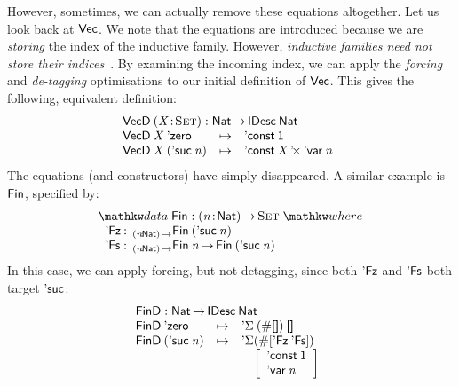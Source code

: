 However, sometimes, we can actually remove these equations altogether. Let us
look back at $\D{Vec}$. We note that the equations are introduced
because we are \emph{storing} the index of the inductive family.
However, \emph{inductive families need not store their
  indices}~\cite{brady:index-inductive-families}.  By examining the
incoming index, we can apply the \emph{forcing} and \emph{de-tagging}
optimisations to our initial definition of $\D{Vec}$. This gives the
following, equivalent definition:
%
\[\stk{
\VecD \:\PITEL{\V{X}}{\Set} : \Nat \To \IDesc{\Nat} \\
\begin{array}{@{}lll}
\VecD\:\V{X}\: \NatZero     & \mapsto & \DConst{\Unit} \\
\VecD\:\V{X}\: (\NatSuc{\V{n}}) & \mapsto & \DProd{\DConst{\V{X}}}{\DVar{\V{n}}}
\end{array}
                                       
}\]
%
The equations (and constructors) have simply disappeared. A similar
example is $\SYMBFin$, specified by:
%
\[
\stk{
\data \SYMBFin : \PI{\V{n}}{\Nat} \Set \where \\
\;\;\begin{array}{@{}l@{\::\:\:}l@{\quad}l}
    \FinZero      & _{\PI{\V{n}}{\Nat}}\Fin{(\NatSuc{\V{n}})}   \\
    \SYMBFinSuc   & _{\PI{\V{n}}{\Nat}}\Fin{\V{n}} \To \Fin{(\NatSuc{\V{n}})}
\end{array}
}\]
%
In this case, we can apply forcing, but not detagging, since both
$\FinZero$ and $\SYMBFinSuc$ both target $\SYMBNatSuc$:
%
\[\stk{
\FinD : \Nat \To \IDesc{\Nat} \\
\begin{array}{@{}lll@{}l}
\FinD\: \NatZero         & \mapsto & \multicolumn{2}{l}{\DSigma{(\EnumT{\Void})}{\Void} } \\
\FinD\: (\NatSuc{\V{n}}) & \mapsto & \SYMBDSigma & (\EnumT{\sqr{ \FinZero \: \SYMBFinSuc }}) \\
                         &         &             & \bigRedBracket{
                                                   \begin{array}{l}
                                                       \DConst{\Unit} \\
                                                       \DVar{\V{n}}
                                                   \end{array}}
\end{array}
}\]

